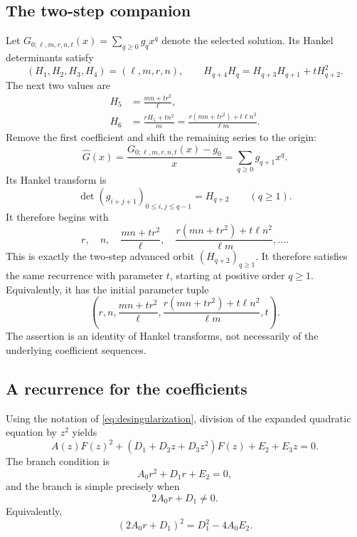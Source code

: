\documentclass[11pt]{article}
\theoremstyle{remark}
\begin{document}
\subsection{The two-step companion}
Let $G_{0;\ell,m,r,n,t}(x)=\sum_{q\geq0}g_qx^q$ denote the selected solution.
Its Hankel determinants satisfy
\begin{equation}
 (H_1,H_2,H_3,H_4)=(\ell,m,r,n),\qquad
 H_{q+4}H_q=H_{q+3}H_{q+1}+tH_{q+2}^2.
 \label{eq:parameter-meaning}
\end{equation}
The next two values are
\begin{align}
 H_5&=\frac{mn+tr^2}{\ell}, \label{eq:fifth-Hankel}\\
 H_6&=\frac{rH_5+tn^2}{m}
 =\frac{r(mn+tr^2)+t\ell n^2}{\ell m}. \label{eq:sixth-Hankel}
\end{align}
Remove the first coefficient and shift the remaining series to the origin:
\begin{equation}
 \widehat G(x)=\frac{G_{0;\ell,m,r,n,t}(x)-g_0}{x}
 =\sum_{q\geq0}g_{q+1}x^q.
 \label{eq:coefficient-tail}
\end{equation}
Its Hankel transform is
\begin{equation}
 \det(g_{i+j+1})_{0\leq i,j\leq q-1}
 =H_{q+2}\qquad(q\geq1).
 \label{eq:tail-shift-hankel-identity}
\end{equation}
It therefore begins with
\[
 r,\quad n,\quad
 \frac{mn+tr^2}{\ell},\quad
 \frac{r(mn+tr^2)+t\ell n^2}{\ell m},\ldots .
\]
This is exactly the two-step advanced orbit $(H_{q+2})_{q\geq1}$.  It therefore satisfies the same recurrence with parameter $t$, starting at positive order $q\geq1$.
Equivalently, it has the initial parameter tuple
\begin{equation}
 \left(r,n,
 \frac{mn+tr^2}{\ell},
 \frac{r(mn+tr^2)+t\ell n^2}{\ell m},t\right).
 \label{eq:two-step-parameter-shift}
\end{equation}
The assertion is an identity of Hankel transforms, not necessarily of the
underlying coefficient sequences.  

\subsection{A recurrence for the coefficients}

Using the notation of \eqref{eq:desingularization}, division of the expanded
quadratic equation by $z^2$ yields
\begin{equation}
 A(z)F(z)^2+(D_1+D_2z+D_3z^2)F(z)+E_2+E_3z=0.
 \label{eq:desingularized-quadratic}
\end{equation}
The branch condition is
\begin{equation}
 A_0r^2+D_1r+E_2=0,
 \label{eq:branch-selection}
\end{equation}
and the branch is simple precisely when
\begin{equation}
 2A_0r+D_1\ne0.
 \label{eq:nondegeneracy}
\end{equation}
Equivalently,
\begin{equation}
 (2A_0r+D_1)^2=D_1^2-4A_0E_2.
 \label{eq:branch-discriminant}
\end{equation}
\end{document}
